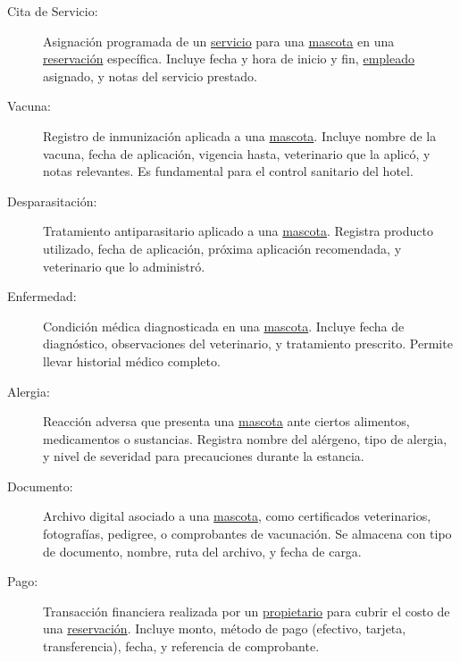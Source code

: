 \begin{description}
	\item[\hypertarget{tCitaServicio}{Cita de Servicio:}] Asignación programada de un \hyperlink{tServicio}{servicio} para una \hyperlink{tMascota}{mascota} en una \hyperlink{tReservacion}{reservación} específica. Incluye fecha y hora de inicio y fin, \hyperlink{tEmpleado}{empleado} asignado, y notas del servicio prestado.
	
	
	\item[\hypertarget{tVacuna}{Vacuna:}] Registro de inmunización aplicada a una \hyperlink{tMascota}{mascota}. Incluye nombre de la vacuna, fecha de aplicación, vigencia hasta, veterinario que la aplicó, y notas relevantes. Es fundamental para el control sanitario del hotel.
	
	\item[\hypertarget{tDesparasitacion}{Desparasitación:}] Tratamiento antiparasitario aplicado a una \hyperlink{tMascota}{mascota}. Registra producto utilizado, fecha de aplicación, próxima aplicación recomendada, y veterinario que lo administró.
	
	\item[\hypertarget{tEnfermedad}{Enfermedad:}] Condición médica diagnosticada en una \hyperlink{tMascota}{mascota}. Incluye fecha de diagnóstico, observaciones del veterinario, y tratamiento prescrito. Permite llevar historial médico completo.
	
	\item[\hypertarget{tAlergia}{Alergia:}] Reacción adversa que presenta una \hyperlink{tMascota}{mascota} ante ciertos alimentos, medicamentos o sustancias. Registra nombre del alérgeno, tipo de alergia, y nivel de severidad para precauciones durante la estancia.
	
	
	\item[\hypertarget{tDocumento}{Documento:}] Archivo digital asociado a una \hyperlink{tMascota}{mascota}, como certificados veterinarios, fotografías, pedigree, o comprobantes de vacunación. Se almacena con tipo de documento, nombre, ruta del archivo, y fecha de carga.
	
	\item[\hypertarget{tPago}{Pago:}] Transacción financiera realizada por un \hyperlink{tPropietario}{propietario} para cubrir el costo de una \hyperlink{tReservacion}{reservación}. Incluye monto, método de pago (efectivo, tarjeta, transferencia), fecha, y referencia de comprobante.
	

\end{description}
